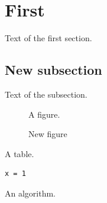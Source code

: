 \documentclass{article}
\begin{document}
\lstlistoflistings
\listofalgorithms
\section{First}
\startcontents
{}
Text of the first section.
\subsection{New subsection}
Text of the subsection.
\begin{figure}[h]
\centering A figure.
\caption{New figure}
\end{figure}
\begin{table}[h]
\centering A table.
\caption{New table}
\end{table}
\begin{lstlisting}[caption={New listing}]
x = 1
\end{lstlisting}
\begin{algorithm}[h]
An algorithm.
\caption{New algorithm}
\end{algorithm}
\end{document}
